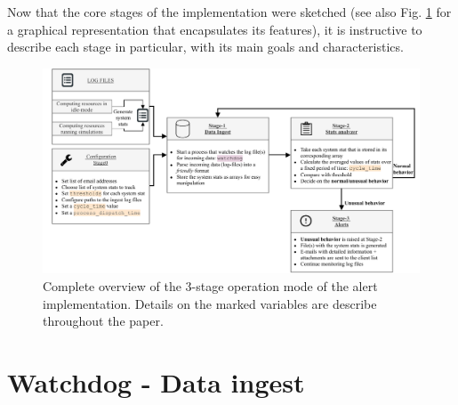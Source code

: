 \documentclass[conference]{IEEEtran}
\begin{document}
\par Now that the core stages of the implementation were sketched (see also Fig. \ref{fig-operation-mode} for a graphical representation that encapsulates its features), it is instructive to describe each stage in particular, with its main goals and characteristics.

\begin{figure}[htbp]
    \centering
    \includegraphics[width=1.0\textwidth]{figs/alert_system_operation_mode.pdf}
    \caption{Complete overview of the 3-stage operation mode of the alert implementation. Details on the marked variables are describe throughout the paper.}
    \label{fig-operation-mode}
\end{figure}

\section{Watchdog - Data ingest}
\label{section-data-ingest}
\end{document}
